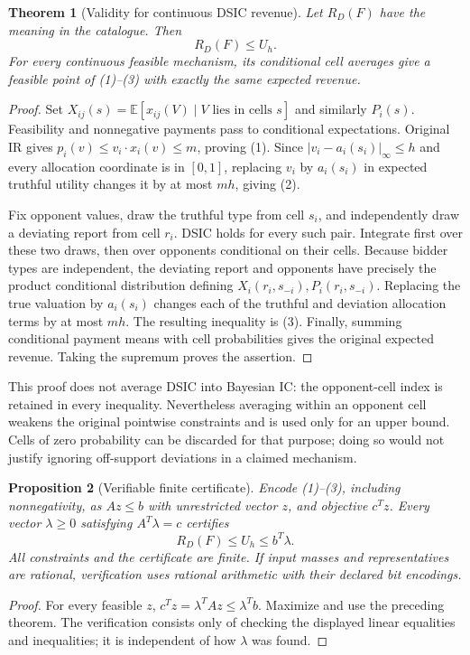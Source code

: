 \documentclass[11pt,a4paper]{article}
\newtheorem{theorem}{Theorem}[section]
\newtheorem{proposition}[theorem]{Proposition}
\theoremstyle{remark}
\newcommand{\E}{\mathbb E}
\begin{document}
\begin{theorem}[Validity for continuous DSIC revenue]
Let $R_D(F)$ have the meaning in the catalogue. Then
\[
 R_D(F)\le U_h.
\]
For every continuous feasible mechanism, its conditional cell averages give a feasible point of (1)--(3) with exactly the same expected revenue.
\end{theorem}
\begin{proof}
Set $X_{ij}(s)=\E[x_{ij}(V)\mid V\text{ lies in cells }s]$ and similarly $P_i(s)$. Feasibility and nonnegative payments pass to conditional expectations. Original IR gives $p_i(v)\le v_i\cdot x_i(v)\le m$, proving (1). Since $|v_i-a_i(s_i)|_\infty\le h$ and every allocation coordinate is in $[0,1]$, replacing $v_i$ by $a_i(s_i)$ in expected truthful utility changes it by at most $mh$, giving (2).

Fix opponent values, draw the truthful type from cell $s_i$, and independently draw a deviating report from cell $r_i$. DSIC holds for every such pair. Integrate first over these two draws, then over opponents conditional on their cells. Because bidder types are independent, the deviating report and opponents have precisely the product conditional distribution defining $X_i(r_i,s_{-i}),P_i(r_i,s_{-i})$. Replacing the true valuation by $a_i(s_i)$ changes each of the truthful and deviation allocation terms by at most $mh$. The resulting inequality is (3). Finally, summing conditional payment means with cell probabilities gives the original expected revenue. Taking the supremum proves the assertion.
\end{proof}

This proof does not average DSIC into Bayesian IC: the opponent-cell index is retained in every inequality. Nevertheless averaging within an opponent cell weakens the original pointwise constraints and is used only for an upper bound. Cells of zero probability can be discarded for that purpose; doing so would not justify ignoring off-support deviations in a claimed mechanism.

\begin{proposition}[Verifiable finite certificate]
Encode (1)--(3), including nonnegativity, as $Az\le b$ with unrestricted vector $z$, and objective $c^Tz$. Every vector $\lambda\ge0$ satisfying $A^T\lambda=c$ certifies
\[
 R_D(F)\le U_h\le b^T\lambda.
\]
All constraints and the certificate are finite. If input masses and representatives are rational, verification uses rational arithmetic with their declared bit encodings.
\end{proposition}
\begin{proof}
For every feasible $z$, $c^Tz=\lambda^TAz\le\lambda^Tb$. Maximize and use the preceding theorem. The verification consists only of checking the displayed linear equalities and inequalities; it is independent of how $\lambda$ was found.
\end{proof}
\end{document}
